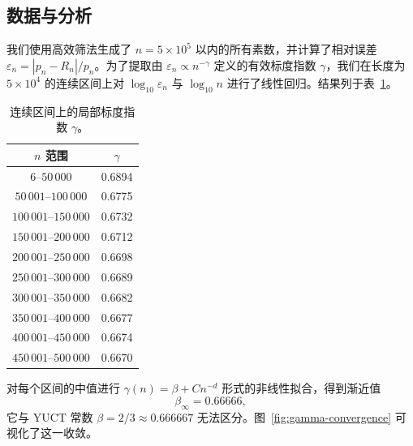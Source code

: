 \documentclass[11pt,a4paper]{article}
\begin{document}
	\subsection{数据与分析}
	我们使用高效筛法生成了 \(n = 5\times10^5\) 以内的所有素数，并计算了相对误差 \(\varepsilon_n = |p_n - R_n|/p_n\)。为了提取由 \(\varepsilon_n \propto n^{-\gamma}\) 定义的有效标度指数 \(\gamma\)，我们在长度为 \(5\times10^4\) 的连续区间上对 \(\log_{10}\varepsilon_n\) 与 \(\log_{10}n\) 进行了线性回归。结果列于表~\ref{tab:gamma}。
	
	\begin{table}[htbp]
		\centering
		\caption{连续区间上的局部标度指数 \(\gamma\)。}
		\label{tab:gamma}
		\small
		\begin{tabular}{c c}
			\toprule
			\(n\) 范围 & \(\gamma\) \\
			\midrule
			\(6\)--\(50\,000\)    & 0.6894 \\
			\(50\,001\)--\(100\,000\) & 0.6775 \\
			\(100\,001\)--\(150\,000\)& 0.6732 \\
			\(150\,001\)--\(200\,000\)& 0.6712 \\
			\(200\,001\)--\(250\,000\)& 0.6698 \\
			\(250\,001\)--\(300\,000\)& 0.6689 \\
			\(300\,001\)--\(350\,000\)& 0.6682 \\
			\(350\,001\)--\(400\,000\)& 0.6677 \\
			\(400\,001\)--\(450\,000\)& 0.6674 \\
			\(450\,001\)--\(500\,000\)& 0.6670 \\
			\bottomrule
		\end{tabular}
	\end{table}
	
	对每个区间的中值进行 \(\gamma(n) = \beta + C n^{-d}\) 形式的非线性拟合，得到渐近值
	\[
	\beta_{\infty} = 0.66666,
	\]
	它与 YUCT 常数 \(\beta = 2/3 \approx 0.666667\) 无法区分。图~\ref{fig:gamma-convergence} 可视化了这一收敛。
	
\end{document}

